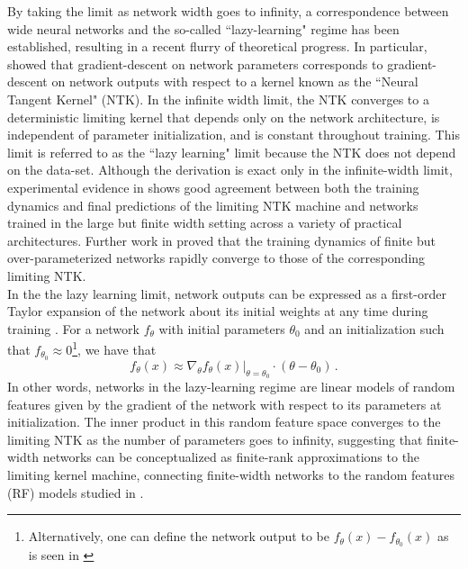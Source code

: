 \documentclass[a4paper, 12pt]{article}
\begin{document}
By taking the limit as network width goes to infinity, a correspondence between wide neural networks and the so-called ``lazy-learning" regime has been established, resulting in a recent flurry of theoretical progress. In particular, \cite{jacotNeuralTangentKernel2018} showed that gradient-descent on network parameters corresponds to gradient-descent on network outputs with respect to a kernel known as the ``Neural Tangent Kernel" (NTK). In the infinite width limit, the NTK converges to a deterministic limiting kernel that depends only on the network architecture, is independent of parameter initialization, and is constant throughout training. This limit is referred to as the ``lazy learning" limit because the NTK does not depend on the data-set. Although the derivation is exact only in the infinite-width limit, experimental evidence in \cite{jacotNeuralTangentKernel2018} shows good agreement between both the training dynamics and final predictions of the limiting NTK machine and networks trained in the large but finite width setting across a variety of practical architectures. Further work in \cite{allen-zhuConvergenceTheoryDeep2019} proved that the training dynamics of finite but over-parameterized networks rapidly converge to those of the corresponding limiting NTK.\\

In the the lazy learning limit, network outputs can be expressed as a first-order Taylor expansion of the network about its initial weights at any time during training \cite{leeWideNeuralNetworks2019}. For a network $f_\theta$ with initial parameters $\theta_0$ and an initialization such that $f_{\theta_0} \approx 0$\footnote{Alternatively, one can define the network output to be $f_{\theta}(x) - f_{\theta_0}(x)$ as is seen in \cite{chizatLazyTrainingDifferentiable2020}}, we have that
\begin{equation}
    f_\theta(x) \approx \nabla_\theta \left.f_\theta(x)\right|_{\theta=\theta_0} \cdot (\theta - \theta_0)\,.
\end{equation}
In other words, networks in the lazy-learning regime are linear models of random features given by the gradient of the network with respect to its parameters at initialization. The inner product in this random feature space converges to the limiting NTK as the number of parameters goes to infinity, suggesting that finite-width networks can be conceptualized as finite-rank approximations to the limiting kernel machine, connecting finite-width networks to the random features (RF) models studied in \cite{rahimiRandomFeaturesLargeScale2008,meiGeneralizationErrorRandom2019}.
\end{document}
